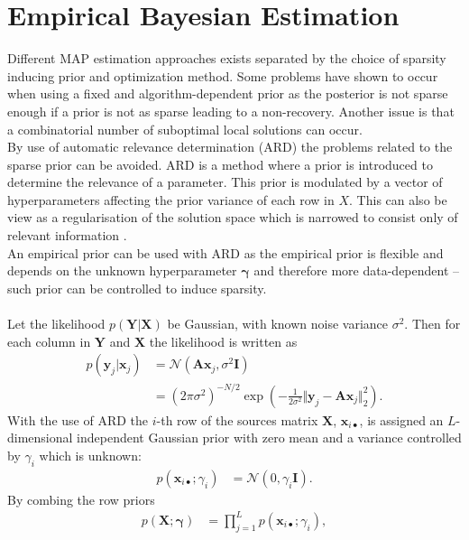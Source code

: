 \section{Empirical Bayesian Estimation}
Different MAP estimation approaches exists separated by the choice of sparsity inducing prior and optimization method. Some problems have shown to occur when using a fixed and algorithm-dependent prior as the posterior is not sparse enough if a prior is not as sparse leading to a non-recovery. 
Another issue is that a combinatorial number of suboptimal local solutions can occur.  
\\
By use of automatic relevance determination (ARD) the problems related to the sparse prior can be avoided. ARD is a method where a prior is introduced to determine the relevance of a parameter. This prior is modulated by a vector of hyperparameters affecting the prior variance of each row in $X$.
This can also be view as a regularisation of the solution space which is narrowed to consist only of relevant information \cite{ARD}.
\\
An empirical prior can be used with ARD as the empirical prior is flexible and depends on the unknown hyperparameter $\boldsymbol{\gamma}$ and therefore more data-dependent -- such prior can be controlled to induce sparsity.
\\ \\
Let the likelihood $p(\mathbf{Y} \vert \mathbf{X})$ be Gaussian, with known noise variance $\sigma^2$. Then for each column in $\mathbf{Y}$ and $\mathbf{X}$ the likelihood is written as
\begin{align*}
p(\mathbf{y}_{j} \vert \mathbf{x}_{j}) &= \mathcal{N}(\mathbf{Ax}_{j}, \sigma^2 \mathbf{I}) \\
&= (2 \pi \sigma^2)^{-N/2} \exp \left( - \frac{1}{2 \sigma^2} \Vert \mathbf{y}_{j} - \mathbf{A} \mathbf{x}_{j} \Vert_2^2 \right).
\end{align*}
With the use of ARD the $i$-th row of the sources matrix $\mathbf{X}$, $\mathbf{x}_{i \bullet}$, is assigned an $L$-dimensional independent Gaussian prior with zero mean and a variance controlled by $\gamma_i$ which is unknown:
\begin{align*}
p (\mathbf{x}_{i \bullet} ; \gamma_i) &= \mathcal{N}(0, \gamma_i \mathbf{I}).
\end{align*}
By combing the row priors
\begin{align*}
p (\mathbf{X} ; \boldsymbol{\gamma}) &= \prod_{j=1}^L p (\mathbf{x}_{i \bullet} ; \gamma_i),
\end{align*}
